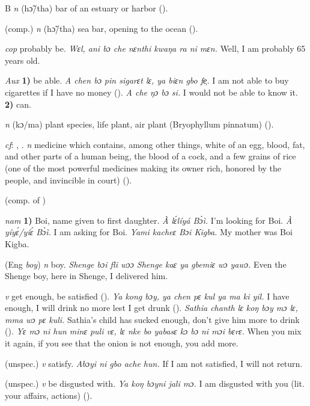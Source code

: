\begin{letter}{B}
 \textit{n} (hɔ̃/tha) bar of an estuary or harbor (\citealt{Pichl1967}).

 (comp.) \textit{n} (hɔ̃/tha) sea bar, opening to the ocean (\citealt{Pichl1967}). 

 \textit{cop} probably be. \textit{Wɛl, ani bɔ che nɛnthi kwaŋa ra ni mɛn.} Well, I am probably 65 years old.

 \textit{Aux} \textbf{1)} be able. \textit{A chen bɔ pin sigarɛt lɛ, ya biɛn gbo fe̹.} I am not able to buy cigarettes if I have no money (\citealt{Pichl1967}). \textit{A che ŋɔ bɔ si.} I would not be able to know it. \textbf{2)} can.

 \textit{n} (kɔ/ma) plant species, life plant, air plant (Bryophyllum pinnatum) (\citealt{Pichl1967}).

 \textit{cf}: , . \textit{n} medicine which contains, among other things, white of an egg, blood, fat, and other parts of a human being, the blood of a cock, and a few grains of rice (one of the most powerful medicines making its owner rich, honored by the people, and invincible in court) (\citealt{Pichl1967}). 

 (comp. of ) 

 \textit{nam} \textbf{1)} Boi, name given to first daughter. \textit{À lɛ́líyá Bɔ̀ì.} I'm looking for Boi. \textit{À yíyɛ́/yíɛ́ Bɔ̀ì.} I am asking for Boi. \textit{Yami kacheɛ Bɔi Kigba.} My mother was Boi Kigba.

 (Eng \textit{boy}) \textit{n} boy. \textit{Shenge bɔi fli wɔɔ Shenge kaɛ ya gbemiɛ wɔ yawɔ.} Even the Shenge boy, here in Shenge, I delivered him.

 \textit{v} get enough, be satisfied (\citealt{Pichl1967}). \textit{Ya kong bɔy, ya chen pɛ kul ya ma ki yil.} I have enough, I will drink no more lest I get drunk (\citealt{Pichl1967}). \textit{Sathia chanth lɛ koŋ bɔy mɔ lɛ, mma wɔ pɛ kuli.} Sathia's child has sucked enough, don't give him more to drink (\citealt{Pichl1967}). \textit{Yɛ mɔ ni hun minɛ puli vɛ, lɛ nke bo yabasɛ kɔ bɔ ni mɔi bɛrɛ.} When you mix it again, if you see that the onion is not enough, you add more.

 (unspec.) \textit{v} satisfy. \textit{Abɔyi ni gbo ache hun.} If I am not satisfied, I will not return.

 (unspec.) \textit{v} be disgusted with. \textit{Ya koŋ bɔyni jali mɔ.} I am disgusted with you (lit. your affairs, actions) (\citealt{Pichl1967}). 


\end{letter}
